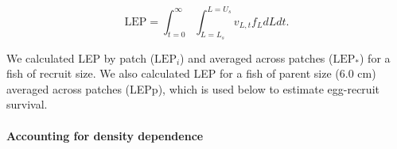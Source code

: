 \documentclass[12pt, oneside]{article}   	%
\begin{document}


\begin{equation}
\text{LEP} = \int_{t=0}^{\infty}\int_{L=L_s}^{L=U_s} v_{L,t} f_L dL dt. \label{EQN_LEP}
\end{equation}

We calculated LEP by patch ($\text{LEP}_i$) and averaged across patches ($\text{LEP}_*$) for a fish of recruit size. We also calculated LEP for a fish of parent size (6.0 cm) averaged across patches (LEPp), which is used below to estimate egg-recruit survival.

\paragraph*{Accounting for density dependence}  %
\end{document}
